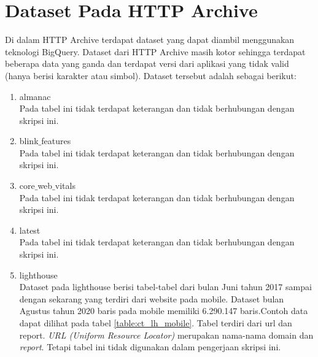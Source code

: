 \section{Dataset Pada HTTP Archive}
Di dalam HTTP Archive terdapat dataset yang dapat diambil menggunakan teknologi BigQuery. Dataset dari HTTP Archive masih kotor sehingga terdapat beberapa data yang ganda dan terdapat versi dari aplikasi yang tidak valid (hanya berisi karakter atau simbol). Dataset tersebut adalah sebagai berikut:
\begin{enumerate}
	\item almanac\\
	Pada tabel ini tidak terdapat keterangan dan tidak berhubungan dengan skripsi ini.
	\item blink$\_$features\\
	Pada tabel ini tidak terdapat keterangan dan tidak berhubungan dengan skripsi ini.
	\item core$\_$web$\_$vitals\\
	Pada tabel ini tidak terdapat keterangan dan tidak berhubungan dengan skripsi ini.
	\item latest\\
	Pada tabel ini tidak terdapat keterangan dan tidak berhubungan dengan skripsi ini.
	\item lighthouse\\
	Dataset pada lighthouse berisi tabel-tabel dari bulan Juni tahun 2017 sampai dengan sekarang yang terdiri dari website pada mobile. Dataset bulan Agustus tahun 2020 baris pada mobile memiliki 6.290.147 baris.Contoh data dapat dilihat pada tabel \ref{table:ct_lh_mobile}. Tabel terdiri dari url dan report. \textit{URL (Uniform Resource Locator)} merupakan nama-nama domain dan \textit{report}. Tetapi tabel ini tidak digunakan dalam pengerjaan skripsi ini. 
	

\end{enumerate}
